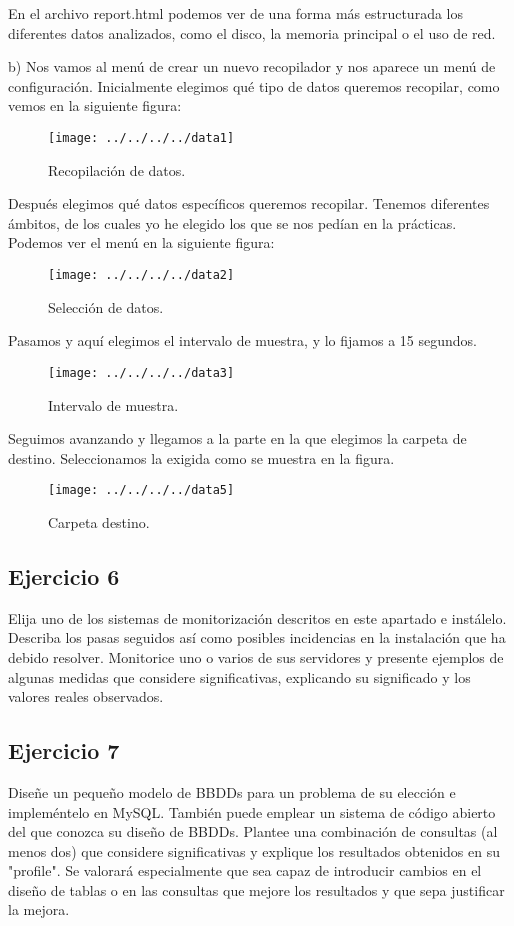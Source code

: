 \documentclass[a4paper, 11pt]{article} %
\begin{document}
En el archivo report.html podemos ver de una forma más estructurada los diferentes datos analizados, como el disco, la memoria principal o el uso de red. 

b) Nos vamos al menú de crear un nuevo recopilador y nos aparece un menú de configuración. Inicialmente elegimos qué tipo de datos queremos recopilar, como vemos en la siguiente figura: 

\begin{figure}[htpb]
\centering
\texttt{[image: ../../../../data1]}
\caption{Recopilación de datos.}
\end{figure}

Después elegimos qué datos específicos queremos recopilar. Tenemos diferentes ámbitos, de los cuales yo he elegido los que se nos pedían en la prácticas. Podemos ver el menú en la siguiente figura: 

\begin{figure}[htpb]
\centering
\texttt{[image: ../../../../data2]}
\caption{Selección de datos.}
\end{figure}

Pasamos y aquí elegimos el intervalo de muestra, y lo fijamos a 15 segundos. 

\begin{figure}[htpb]
\centering
\texttt{[image: ../../../../data3]}
\caption{Intervalo de muestra.}
\end{figure}

Seguimos avanzando y llegamos a la parte en la que elegimos la carpeta de destino. Seleccionamos la exigida como se muestra en la figura. 

\begin{figure}[htpb]
\centering
\texttt{[image: ../../../../data5]}
\caption{Carpeta destino.}
\end{figure}

\subsection{Ejercicio 6}
Elija uno de los sistemas de monitorización descritos en este apartado e instálelo. Describa los pasas seguidos así como posibles incidencias en la instalación que ha debido resolver. Monitorice uno o varios de sus servidores y presente ejemplos de algunas medidas que considere significativas, explicando su significado y los valores reales observados. 

\subsection{Ejercicio 7}
Diseñe un pequeño modelo de BBDDs para un problema de su elección e impleméntelo en MySQL. También puede emplear un sistema de código abierto del que conozca su diseño de BBDDs. Plantee una combinación de consultas (al menos dos) que considere significativas y explique los resultados obtenidos en su "profile". Se valorará especialmente que sea capaz de introducir cambios en el diseño de tablas o en las consultas que mejore los resultados y que sepa justificar la mejora. 
\end{document}
